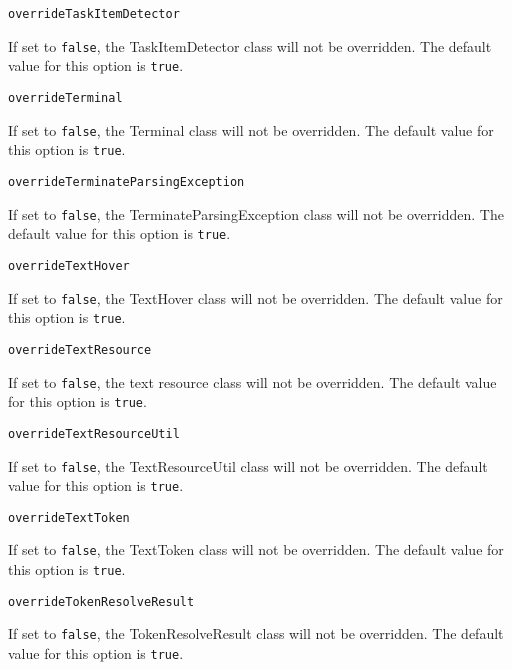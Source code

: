 \noindent\texttt{overrideTaskItemDetector}
\begin{myindentpar}{1cm}
If set to \texttt{false}, the TaskItemDetector class will not be overridden. The default value for this option is \texttt{true}.
\end{myindentpar}

\noindent\texttt{overrideTerminal}
\begin{myindentpar}{1cm}
If set to \texttt{false}, the Terminal class will not be overridden. The default value for this option is \texttt{true}.
\end{myindentpar}

\noindent\texttt{overrideTerminateParsingException}
\begin{myindentpar}{1cm}
If set to \texttt{false}, the TerminateParsingException class will not be overridden. The default value for this option is \texttt{true}.
\end{myindentpar}

\noindent\texttt{overrideTextHover}
\begin{myindentpar}{1cm}
If set to \texttt{false}, the TextHover class will not be overridden. The default value for this option is \texttt{true}.
\end{myindentpar}

\noindent\texttt{overrideTextResource}
\begin{myindentpar}{1cm}
If set to \texttt{false}, the text resource class will not be overridden. The default value for this option is \texttt{true}.
\end{myindentpar}

\noindent\texttt{overrideTextResourceUtil}
\begin{myindentpar}{1cm}
If set to \texttt{false}, the TextResourceUtil class will not be overridden. The default value for this option is \texttt{true}.
\end{myindentpar}

\noindent\texttt{overrideTextToken}
\begin{myindentpar}{1cm}
If set to \texttt{false}, the TextToken class will not be overridden. The default value for this option is \texttt{true}.
\end{myindentpar}

\noindent\texttt{overrideTokenResolveResult}
\begin{myindentpar}{1cm}
If set to \texttt{false}, the TokenResolveResult class will not be overridden. The default value for this option is \texttt{true}.
\end{myindentpar}


